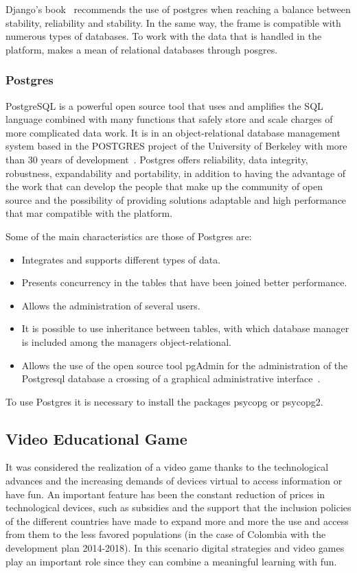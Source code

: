 \documentclass[journal,transmag]{IEEEtran}
\begin{document}
Django's book~\cite{DjangoM} recommends the use of postgres when reaching a balance between stability, reliability and stability. In the same way, the frame is compatible with numerous types of databases. To work with the data that is handled in the platform, makes a mean of relational databases through posgres.

\subsubsection{Postgres}
PostgreSQL is a powerful open source tool that uses and amplifies the SQL language combined with many functions that safely store and scale charges of more complicated data work. It is in an object-relational database management system based in the POSTGRES project of the University of Berkeley with more than 30 years of development~\cite{Postgres}. Postgres offers reliability, data integrity, robustness, expandability and portability, in addition to having the advantage of the work that can develop the people that make up the community of open source and the possibility of providing solutions adaptable and high performance that mar compatible with the platform.

Some of the main characteristics are those of Postgres are:

\begin{itemize}
\item Integrates and supports different types of data.
\item Presents concurrency in the tables that have been joined better performance.
\item Allows the administration of several users.
\item It is possible to use inheritance between tables, with which database manager is included among the managers object-relational.
\item Allows the use of the open source tool pgAdmin for the administration of the Postgresql database a crossing of a graphical administrative interface~\cite{Pgadmin}. 
\end{itemize}

To use Postgres it is necessary to install the packages psycopg or psycopg2.

\subsection{Video Educational Game}\label{videojuego}
It was considered the realization of a video game thanks to the technological advances and the increasing demands of devices virtual to access information or have fun. An important feature has been the constant reduction of prices in technological devices, such as subsidies and the support that the inclusion policies of the different countries have made to expand more and more the use and access from them to the less favored populations (in the case of Colombia with the development plan 2014-2018). In this scenario digital strategies and video games play an important role since they can combine a meaningful learning with fun.
\end{document}
